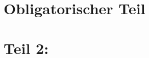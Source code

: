 \documentclass{scrreprt}
\begin{document}
  \part{Obligatorischer Teil}

  


  \part{Teil 2:}
\end{document}
